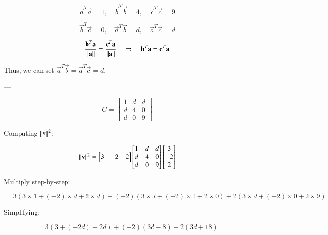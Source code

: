\documentclass[journal]{IEEEtran}
\begin{document}
\begin{equation}
\vec{a}^T\vec{a} = 1,\quad
\vec{b}^T\vec{b} = 4,\quad
\vec{c}^T\vec{c} = 9
\end{equation}

\begin{equation}
\vec{b}^T\vec{c} = 0,\quad
\vec{a}^T\vec{b} = d,\quad
\vec{a}^T\vec{c} = d
\end{equation}

\begin{equation}
\frac{\mathbf{b}^T \mathbf{a}}{\left\lVert\mathbf{a}\right\rVert} = \frac{\mathbf{c}^T \mathbf{a}}{\left\lVert\mathbf{a}\right\rVert}
\quad \Rightarrow \quad
\mathbf{b}^T\mathbf{a} = \mathbf{c}^T\mathbf{a}
\end{equation}

Thus, we can set $\vec{a}^T\vec{b} = \vec{a}^T\vec{c} = d$.

---


\begin{equation}
G = \begin{bmatrix}
1 & d & d \\
d & 4 & 0 \\
d & 0 & 9
\end{bmatrix}
\end{equation}


Computing $\left\lVert\mathbf{v}\right\rVert^2$:

\begin{equation}
\left\lVert\mathbf{v}\right\rVert^2 = 
\begin{bmatrix} 3 & -2 & 2 \end{bmatrix}
\begin{bmatrix}
1 & d & d \\
d & 4 & 0 \\
d & 0 & 9
\end{bmatrix}
\begin{bmatrix} 3 \\ -2 \\ 2 \end{bmatrix}
\end{equation}

Multiply step-by-step:

\begin{equation}
= 3(3 \times 1 + (-2)\times d + 2\times d) + (-2)(3\times d + (-2)\times 4 + 2\times 0) + 2(3\times d + (-2)\times 0 + 2\times 9)
\end{equation}

Simplifying:

\begin{equation}
= 3(3 + (-2d) + 2d) + (-2)(3d - 8) + 2(3d + 18)
\end{equation}
\end{document}
